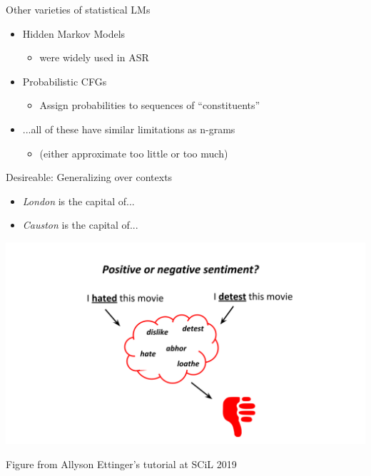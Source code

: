 \documentclass{beamer}
\begin{document}
 \begin{frame}{Other varieties of statistical LMs}
 \begin{itemize}
     \item Hidden Markov Models
     \begin{itemize}
         \item were widely used in ASR
     \end{itemize}
     \item Probabilistic CFGs
     \begin{itemize}
         \item Assign probabilities to sequences of ``constituents''
     \end{itemize}
     \item ...all of these have similar limitations as n-grams
     \begin{itemize}
         \item (either approximate too little or too much)
     \end{itemize}
 \end{itemize}
 \end{frame}

\begin{frame}{Desireable: Generalizing over contexts}
    \begin{itemize}
        \item {\it London} is the capital of...
        \item {\it Causton} is the capital of...
    \end{itemize}
    
    \includegraphics[height=0.5\textheight]{figures/sentiment.png}
    
    {\tiny Figure from Allyson Ettinger's tutorial at SCiL 2019}
\end{frame}
\end{document}
